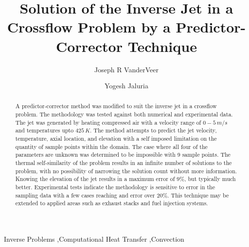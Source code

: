 \documentclass[preprint,12pt]{elsarticle}
\begin{document}
\begin{frontmatter}
\title{Solution of the Inverse Jet in a Crossflow Problem by a Predictor-Corrector Technique}

\author{Joseph R VanderVeer}
\author{Yogesh Jaluria}

\address{Department of Mechanical and Aerospace Engineering: Rutgers University, 98 Brett Rd, Piscataway NJ, 08854}



\begin{abstract}
A predictor-corrector method was modified to suit the inverse jet in a crossflow problem.  The methodology was tested against both numerical and experimental data.  The jet was generated by heating compressed air with a velocity range of $0-5\,m/s$ and temperatures upto $425\,K$.  The method attempts to predict the jet velocity, temperature, axial location, and elevation with a self imposed limitation on the quantity of sample points within the domain.  The case where all four of the parameters are unknown was determined to be impossible with 9 sample points.  The thermal self-similarity of the problem results in an infinite number of solutions to the problem, with no possibility of narrowing the solution count without more information.  Knowing the elevation of the jet results in a maximum error of $9\%$, but typically much better.  Experimental tests indicate the methodology is sensitive to error in the sampling data with a few cases reaching and error over $20\%$.  This technique may be extended to applied areas such as exhaust stacks and fuel injection systems.

\end{abstract}
\begin{keyword}
Inverse Problems \sep Computational Heat Transfer \sep Convection
\end{keyword}
\end{frontmatter}


\newlength\figureheight 
\newlength\figurewidth 
	
	
	
\end{document}
